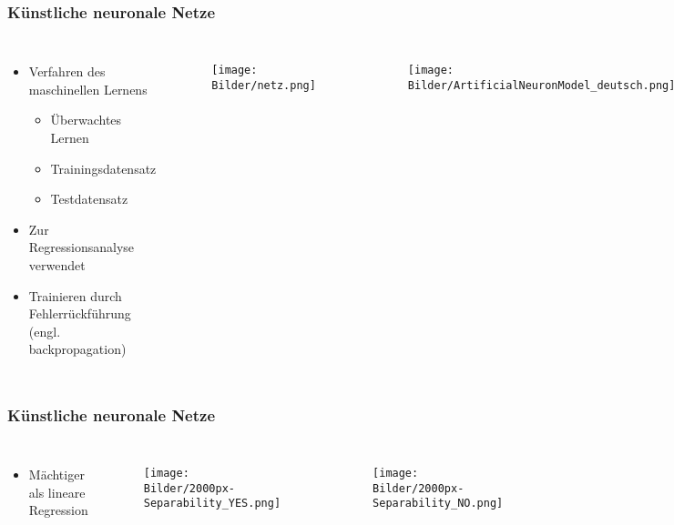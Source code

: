 \documentclass{beamer}
\begin{document}
\begin{frame}
\frametitle{Künstliche neuronale Netze}
\begin{columns}
\begin{itemize}
	\item Verfahren des maschinellen Lernens
	\begin{itemize}
		\item Überwachtes Lernen
		\item Trainingsdatensatz
		\item Testdatensatz
	\end{itemize}
	\item Zur Regressionsanalyse verwendet
	\item Trainieren durch Fehlerrückführung (engl. backpropagation)
\end{itemize}

\begin{figure}
\texttt{[image: Bilder/netz.png]}
\end{figure}

\begin{figure}
\texttt{[image: Bilder/ArtificialNeuronModel\_deutsch.png]}
\end{figure}
\end{columns}
\end{frame}

\begin{frame}
\frametitle{Künstliche neuronale Netze}
\begin{columns}
\begin{itemize}
	\item Mächtiger als lineare Regression
\end{itemize}

\begin{figure}
\texttt{[image: Bilder/2000px-Separability\_YES.png]}
\end{figure}
\begin{figure}
\texttt{[image: Bilder/2000px-Separability\_NO.png]}
\end{figure}

\end{columns}
\end{frame}
\end{document}
